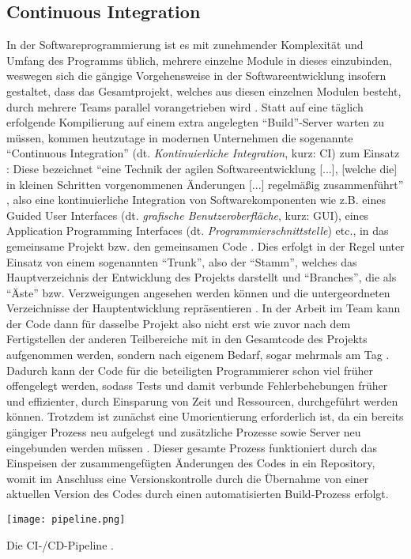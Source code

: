 \subsection{Continuous Integration}
In der Softwareprogrammierung ist es mit zunehmender Komplexität und Umfang des Programms üblich, mehrere einzelne Module in dieses einzubinden, weswegen sich die gängige Vorgehensweise in der Softwareentwicklung insofern gestaltet, dass das Gesamtprojekt,
welches aus diesen einzelnen Modulen besteht, durch mehrere Teams parallel vorangetrieben wird \cite{HJL:2018aa}. \newline Statt auf eine täglich erfolgende Kompilierung auf einem extra angelegten \enquote{Build}-Server warten zu müssen, kommen heutzutage in modernen
Unternehmen die sogenannte \enquote{Continuous Integration} (dt. \textit{Kontinuierliche Integration}, kurz: CI) zum Einsatz \cite{HJL:2018aa}: Diese bezeichnet \enquote{eine Technik der agilen Softwareentwicklung [...], [welche die] in kleinen Schritten vorgenommenen Änderungen [...] 
regelmäßig zusammenführt} \cite{Dirk:2018aa}, also eine kontinuierliche Integration von Softwarekomponenten wie z.B. eines Guided User Interfaces (dt. \textit{grafische Benutzeroberfläche}, kurz: GUI), eines Application Programming Interfaces (dt. \textit{Programmierschnittstelle}) etc.,
in das gemeinsame Projekt bzw. den gemeinsamen Code \cite{HJL:2018aa}. \newline Dies erfolgt in der Regel unter Einsatz von einem sogenannten \enquote{Trunk}, also der \enquote{Stamm}, welches das Hauptverzeichnis der Entwicklung des Projekts darstellt  und \enquote{Branches}, die als 
\enquote{Äste} bzw. Verzweigungen angesehen werden können und die untergeordneten Verzeichnisse der Hauptentwicklung repräsentieren \cite{Peters:2015aa}. \newline In der Arbeit im Team kann der Code dann für dasselbe Projekt also nicht erst wie zuvor nach dem Fertigstellen der anderen 
Teilbereiche mit in den Gesamtcode des Projekts aufgenommen werden, sondern nach eigenem Bedarf, sogar mehrmals am Tag \cite{Dirk:2018aa}. Dadurch kann der Code für die beteiligten Programmierer schon viel früher offengelegt werden, sodass Tests und damit verbunde Fehlerbehebungen früher 
und effizienter, durch Einsparung von Zeit und Ressourcen, durchgeführt werden können. \newline Trotzdem ist zunächst eine Umorientierung erforderlich ist, da ein bereits gängiger Prozess neu aufgelegt und zusätzliche Prozesse sowie Server neu eingebunden werden müssen \cite{HJL:2018aa, Dirk:2018aa}. 
Dieser gesamte Prozess funktioniert durch das Einspeisen der zusammengefügten Änderungen des Codes in ein Repository, womit im Anschluss eine Versionskontrolle durch die Übernahme von einer aktuellen Version des Codes durch einen automatisierten Build-Prozess \cite{HJL:2018aa} erfolgt.
\begin{marginfigure}[1\baselineskip] %
    \texttt{[image: pipeline.png]}
    \caption{\label{fig:pipeline}Die CI-/CD-Pipeline \cite{RedHat:2020aa}.}
\end{marginfigure}

